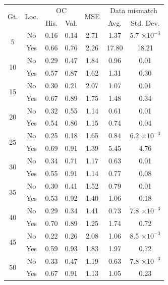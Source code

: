 \begin{tabular}{ccccccc}
\toprule
\multirow{2}{*}{
    Gt.
}
&
\multirow{2}{*}{Loc.} 
& 
\multicolumn{2}{c}{OC} & 
\multirow{2}{*}{
    MSE
} & 
\multicolumn{2}{c}{Data mismatch} 
\\
& & His. & Val. &  & Avg. & Std. Dev.
\\
\midrule
\multirow{2}{*}{5} & No & 0.16 & 0.14 & 2.71 & 1.37 & 5.7 $\times 10^{-3}$ \\
 & Yes & 0.66 & 0.76 & 2.26 & 17.80 & 18.21 \\
\midrule
\multirow{2}{*}{10} & No & 0.29 & 0.47 & 1.84 & 0.96 & 0.01 \\
 & Yes & 0.57 & 0.87 & 1.62 & 1.31 & 0.30 \\
\midrule
\multirow{2}{*}{15} & No & 0.30 & 0.21 & 2.07 & 1.07 & 0.01 \\
 & Yes & 0.67 & 0.89 & 1.75 & 1.48 & 0.34 \\
\midrule
\multirow{2}{*}{20} & No & 0.32 & 0.55 & 1.14 & 0.61 & 0.01 \\
 & Yes & 0.54 & 0.86 & 1.15 & 0.74 & 0.04 \\
\midrule
\multirow{2}{*}{25} & No & 0.25 & 0.18 & 1.65 & 0.84 & 6.2 $\times 10^{-3}$ \\
 & Yes & 0.69 & 0.91 & 1.39 & 5.45 & 4.76 \\
\midrule
\multirow{2}{*}{30} & No & 0.34 & 0.71 & 1.17 & 0.63 & 0.01 \\
 & Yes & 0.55 & 0.91 & 1.14 & 0.77 & 0.08 \\
\midrule
\multirow{2}{*}{35} & No & 0.30 & 0.41 & 1.52 & 0.79 & 0.01 \\
 & Yes & 0.53 & 0.92 & 1.40 & 1.06 & 0.18 \\
\midrule
\multirow{2}{*}{40} & No & 0.29 & 0.34 & 1.41 & 0.73 & 7.8 $\times 10^{-3}$ \\
 & Yes & 0.70 & 0.89 & 1.25 & 1.74 & 0.72 \\
\midrule
\multirow{2}{*}{45} & No & 0.22 & 0.26 & 2.08 & 1.06 & 8.5 $\times 10^{-3}$ \\
 & Yes & 0.59 & 0.93 & 1.83 & 1.97 & 0.72 \\
\midrule
\multirow{2}{*}{50} & No & 0.33 & 0.47 & 1.19 & 0.63 & 7.8 $\times 10^{-3}$ \\
 & Yes & 0.67 & 0.91 & 1.13 & 1.05 & 0.23 \\
\bottomrule
\end{tabular}

